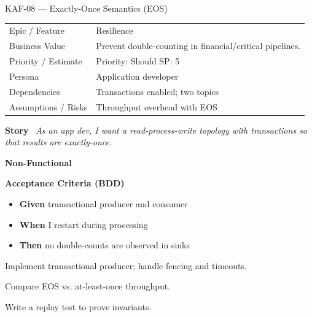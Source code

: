 \documentclass[11pt,a4paper]{article}
\newcommand{\Field}[2]{\textbf{#1}~#2}
\begin{document}
\begin{StoryCardBox}{KAF-08 --- Exactly-Once Semantics (EOS)}
\begin{tabularx}{\linewidth}{LY}
 Epic / Feature & Resilience \\
 Business Value & Prevent double-counting in financial/critical pipelines. \\
 Priority / Estimate & Priority: Should \quad SP: 5 \\
 Persona & Application developer \\
 Dependencies & Transactions enabled; two topics \\
 Assumptions / Risks & Throughput overhead with EOS \\
\end{tabularx}

\medskip
\Field{Story}{\; \emph{As an app dev, I want a read-process-write topology with transactions so that results are exactly-once.}}

\medskip
\Field{Non-Functional}{\; }

\medskip
\Field{Acceptance Criteria (BDD)}{}
\begin{itemize}[leftmargin=1.2em, itemsep=1pt]
  \item \textbf{Given} transactional producer and consumer
  \item \textbf{When} I restart during processing
  \item \textbf{Then} no double-counts are observed in sinks
\end{itemize}

\begin{TasksBox}
\begin{tasklist}
  \item Implement transactional producer; handle fencing and timeouts.
  \item Compare EOS vs. at-least-once throughput.
  \item Write a replay test to prove invariants.
\end{tasklist}
\end{TasksBox}
\end{StoryCardBox}
\clearpage
\end{document}
